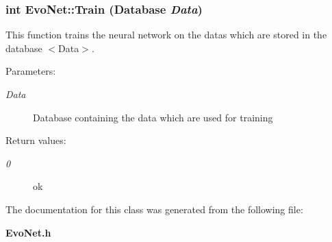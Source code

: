 \subsubsection{\setlength{\rightskip}{0pt plus 5cm}int Evo\-Net::Train (Database {\em Data})}\label{classEvoNet_a11}


This function trains the neural network on the datas which are stored in the database $<$Data$>$.

\begin{Desc}
\item[Parameters: ]\par
\begin{description}
\item[{\em 
Data}]Database containing the data which are used for training \end{description}
\end{Desc}
\begin{Desc}
\item[Return values: ]\par
\begin{description}
\item[{\em 
0}]ok \end{description}
\end{Desc}


The documentation for this class was generated from the following file:\begin{CompactItemize}
\item 
{\bf Evo\-Net.h}\end{CompactItemize}
